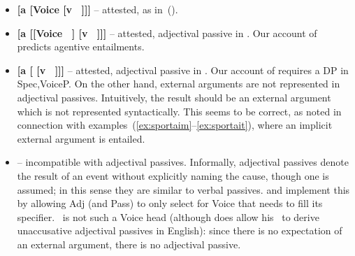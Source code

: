 \begin{itemize}
\item \textbf{[a [Voice [v ~\!]]]} -- attested, as in~(\lastx).

\item \textbf{[a [[Voice {\va}~\!] [v ~\!]]]} -- attested, adjectival passive in \mpua. Our account of {\va} predicts agentive entailments.

\item \textbf{[a [{\vd} [v ~\!]]]} -- attested, adjectival passive in \mhuf. Our account of {\vd} requires a DP in Spec,VoiceP. On the other hand, external arguments are not represented in adjectival passives. Intuitively, the result should be an external argument which is not represented syntactically. This seems to be correct, as noted in connection with examples~(\ref{ex:sportaim}--\ref{ex:sportait}), where an implicit external argument is entailed.
\ex
\xe

\item \textbf{\vz} -- incompatible with adjectival passives. Informally, adjectival passives denote the result of an event without explicitly naming the cause, though one is assumed; in this sense they are similar to verbal passives. \cite{alexiadouetal14} and \cite{bruening14nllt} implement this by allowing Adj (and Pass) to only select for Voice that needs to fill its specifier. \vz~is not such a Voice head (although \citealt{embick04li} does allow his \vz~to derive unaccusative adjectival passives in English): since there is no expectation of an external argument, there is no adjectival passive.
\end{itemize}

